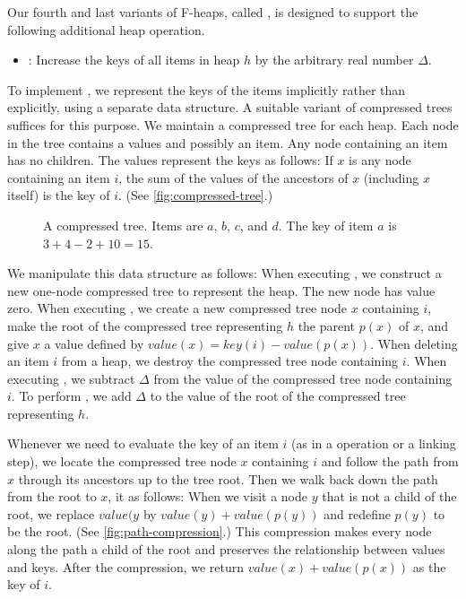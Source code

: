 Our fourth and last variants of F-heaps, called , is
designed to support the following additional heap operation.

\begin{itemize}
	\item {}: Increase the keys of all items in heap
		\(h\) by the arbitrary real number \(\Delta\).
\end{itemize}

To implement , we represent the keys of the items implicitly
rather than explicitly, using a separate data structure. A suitable variant of
compressed trees~\cite{Tarjan1979b} suffices for this purpose. We maintain
a compressed tree for each heap. Each node in the tree contains a values and possibly
an item. Any node containing an item has no children. The values represent the keys
as follows: If \(x\) is any node containing an item \(i\), the sum of the values of
the ancestors of \(x\) (including \(x\) itself) is the key of \(i\). (See
\autoref{fig:compressed-tree}.)

\begin{figure}
	\caption{A compressed tree. Items are \(a\), \(b\), \(c\), and \(d\). The key
	of item \(a\) is \(3 + 4 - 2 + 10 = 15\).}
    \label{fig:compressed-tree}
\end{figure}

We manipulate this data structure as follows: When executing , we
construct a new one-node compressed tree to represent the heap. The new node has
value zero. When executing , we create a new compressed tree
node \(x\) containing \(i\), make the root of the compressed tree representing \(h\)
the parent \(p(x)\) of \(x\), and give \(x\) a value defined by \(value(x) = key(i)
- value(p(x))\). When deleting an item \(i\) from a heap, we destroy the compressed
tree node containing \(i\). When executing , we
subtract \(\Delta\) from the value of the compressed tree node containing \(i\).  To
perform , we add \(\Delta\) to the value of the
root of the compressed tree representing \(h\).

Whenever we need to evaluate the key of an item \(i\) (as in a 
operation or a linking step), we locate the compressed tree node \(x\) containing
\(i\) and follow the path from \(x\) through its ancestors up to the tree root. Then
we walk back down the path from the root to \(x\),  it as follows:
When we visit a node \(y\) that is not a child of the root, we replace \(value(y\) by
\(value(y) + value(p(y))\) and redefine \(p(y)\) to be the root. (See
\autoref{fig:path-compression}.) This compression makes every node along the path
a child of the root and preserves the relationship between values and keys. After the
compression, we return \(value(x) + value(p(x))\) as the key of \(i\).

